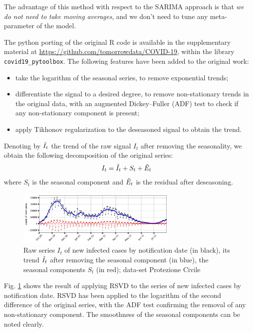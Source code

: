 \documentclass[graybox]{svmult}
\begin{document}
The advantage of this method with respect to the SARIMA approach is that \emph{we do not need to take moving averages}, and we don't need to tune any meta-parameter of the model.

The python porting of the original R code is available in the supplementary material at \href{https://github.com/tomorrowdata/COVID-19}{https://github.com/tomorrowdata/COVID-19}, within the library \texttt{covid19\_pytoolbox}. The following features have been added to the original work:
\begin{itemize}
    \item take the logarithm of the seasonal series, to remove exponential trends;
    \item differentiate the signal to a desired degree, to remove non-stationary trends in the original data, with an augmented Dickey–Fuller (ADF) test to check if any non-stationary component is present;
    \item apply Tikhonov regularization to the deseasoned signal to obtain the trend.
\end{itemize}

Denoting by $\Tilde{I}_t$ the trend of the raw signal $I_t$ after removing the seasonality, we obtain the following decomposition of the original series:
\begin{equation}
    I_t = \Tilde{I}_t + S_t + \Tilde{E}_t
\end{equation}
where $S_t$ is the seasonal component and $\Tilde{E}_t$ is the residual after deseasoning.

\begin{figure}[t]
\center
\includegraphics[width=0.7\textwidth]{Rt_images/new_cases_deseason.jpg}
\caption{Raw series $I_t$ of new infected cases by notification date (in black), its trend $\Tilde{I}_t$ after removing the seasonal component (in blue), the seasonal components $S_t$ (in red); data-set Protezione Civile}
\label{new_cases_deseason}
\end{figure}

Fig. \ref{new_cases_deseason} shows the result of applying RSVD to the series of new infected cases by notification date. RSVD has been applied to the logarithm of the second difference of the original series, with the ADF test confirming the removal of any non-stationary component. The smoothness of the seasonal components can be noted clearly.
\end{document}

